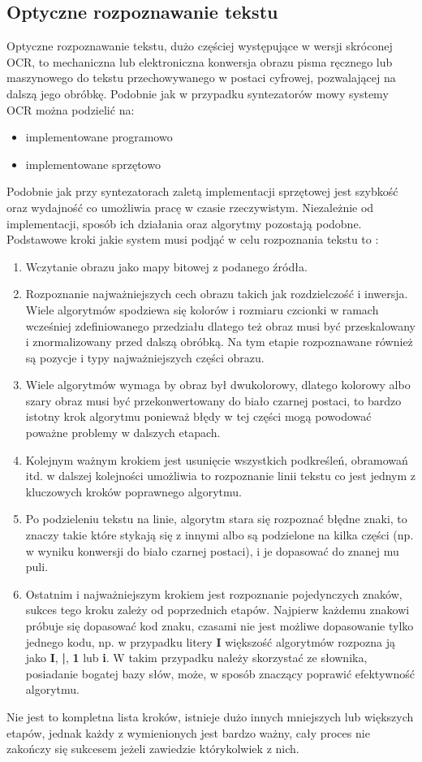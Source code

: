 \subsection{Optyczne rozpoznawanie tekstu}
Optyczne rozpoznawanie tekstu, dużo częściej występujące w wersji skróconej OCR, to mechaniczna lub elektroniczna konwersja obrazu pisma ręcznego lub maszynowego do tekstu przechowywanego w postaci cyfrowej, pozwalającej na dalszą jego obróbkę. Podobnie jak w przypadku syntezatorów mowy systemy OCR można podzielić na:
\begin{itemize}
	\item implementowane programowo
	\item implementowane sprzętowo
\end{itemize}
Podobnie jak przy syntezatorach zaletą implementacji sprzętowej jest szybkość oraz wydajność co umożliwia pracę w czasie rzeczywistym. Niezależnie od implementacji, sposób ich działania oraz algorytmy pozostają podobne. Podstawowe kroki jakie system musi podjąć w celu rozpoznania tekstu to \cite{noor2005} :
\begin{enumerate}
	\item Wczytanie obrazu jako mapy bitowej z podanego źródła.
	\item Rozpoznanie najważniejszych cech obrazu takich jak rozdzielczość i inwersja. Wiele algorytmów spodziewa się kolorów i rozmiaru czcionki w ramach wcześniej zdefiniowanego przedziału dlatego też obraz musi być przeskalowany i znormalizowany przed dalszą obróbką. Na tym etapie rozpoznawane również są pozycje i typy najważniejszych części obrazu.
	\item Wiele algorytmów wymaga by obraz był dwukolorowy, dlatego kolorowy albo szary obraz musi być przekonwertowany do biało czarnej postaci, to bardzo istotny krok algorytmu ponieważ błędy w tej części mogą powodować poważne problemy w dalszych etapach.
	\item Kolejnym ważnym krokiem jest usunięcie wszystkich podkreśleń, obramowań itd. w dalszej kolejności umożliwia to rozpoznanie linii tekstu co jest jednym z kluczowych kroków poprawnego algorytmu.
	\item Po podzieleniu tekstu na linie, algorytm stara się rozpoznać błędne znaki, to znaczy takie które stykają się z innymi albo są podzielone na kilka części (np. w wyniku konwersji do biało czarnej postaci), i je dopasować do znanej mu puli.
	\item Ostatnim i najważniejszym krokiem jest rozpoznanie pojedynczych znaków, sukces tego kroku zależy od poprzednich etapów. Najpierw każdemu znakowi próbuje się dopasować kod znaku, czasami nie jest możliwe dopasowanie tylko jednego kodu, np. w przypadku litery \textbf{I} większość algorytmów rozpozna ją jako \textbf{I}, \textbf{|}, \textbf{1} lub \textbf{i}. W takim przypadku należy skorzystać ze słownika, posiadanie bogatej bazy słów, może, w sposób znaczący poprawić efektywność algorytmu.
\end{enumerate}
Nie jest to kompletna lista kroków, istnieje dużo innych mniejszych lub większych etapów, jednak każdy z wymienionych jest bardzo ważny, cały proces nie zakończy się sukcesem jeżeli zawiedzie którykolwiek z nich. 
